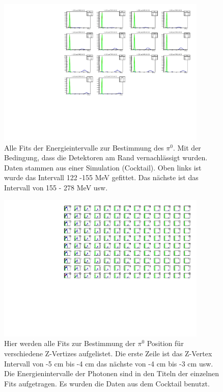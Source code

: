 \documentclass[a4paper,11pt,oneside,final,german,openbib,pdftex]{scrbook}
\begin{document}
{\begin{appendix}
\begin{figure}
	\begin{center}
		\includegraphics[width=100mm]{30DegreeEdgeAllFits}
		\caption{Alle Fits der Energieintervalle zur Bestimmung des $\pi^0$. Mit der Bedingung, dass die Detektoren am Rand vernachl\"assigt wurden. Daten stammen aus einer Simulation (Cocktail). Oben links ist wurde das Intervall 122 -155 MeV gefittet. Das nächste ist das Intervall von 155 - 278 MeV usw.}
		\label{fig:Alle-Fits-ohne-Detektoren-am-Rand}
	\end{center}
\end{figure}

\begin{figure}
	\begin{center}
		\includegraphics[width=100mm]{FullZVertexDependenceAllFits}
		\caption{Hier werden alle Fits zur Bestimmung der $\pi^0$ Position  für verschiedene Z-Vertizes aufgelistet. Die erste Zeile ist das Z-Vertex Intervall von -5 cm bis -4 cm das nächste von -4 cm bis -3 cm usw. Die Energienintervalle der Photonen sind in den Titeln der einzelnen Fits aufgetragen. Es wurden die Daten aus dem Cocktail benutzt.}
		\label{fig:Z-Vertex-All-Fits}
	\end{center}
\end{figure}


\end{appendix}}
\end{document}
